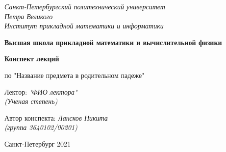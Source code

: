 
\newpage
\thispagestyle{empty}
\begin{center}
	\textit{Санкт-Петербургский политехнический университет\\
		Петра Великого\\
        Институт прикладной математики и информатики}
	\vspace{0.5ex}
	
	\textbf{Высшая школа прикладной математики и вычислительной физики}

    \vspace{30ex}
	\textbf{\large Конспект лекций}
	\vspace{1ex}

	по "Название предмета в родительном падеже"	
    
\end{center}

\begin{flushleft}
	\vspace{20ex}
	\noindent
    Лектор: \hspace{\fill} \textit{"ФИО лектора"}	\\ \hspace{\fill} \textit{(Ученая степень)}

    \vspace{3ex}

    Автор конспекта: \hspace{\fill} \textit{Лансков Никита}	\\ \hspace{\fill} \textit{(группа 3640102/00201)}
\end{flushleft}

\begin{center}
	\vfill
	Санкт-Петербург 2021
\end{center}
\newpage
